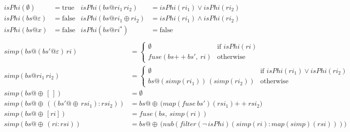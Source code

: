 \begin{equation}
\begin{gathered}
\begin{aligned}
\mathit{isPhi}(\emptyset) &= \mathrm{true} &
\mathit{isPhi}(bs@\mathit{ri}_1\,\mathit{ri}_2)
  &= \mathit{isPhi}(\mathit{ri}_1) \lor \mathit{isPhi}(\mathit{ri}_2) \\
\mathit{isPhi}(bs@\varepsilon) &= \mathrm{false} &
\mathit{isPhi}(bs@\mathit{ri}_1 \oplus \mathit{ri}_2)
  &= \mathit{isPhi}(\mathit{ri}_1) \land \mathit{isPhi}(\mathit{ri}_2) \\
\mathit{isPhi}(bs@x) &= \mathrm{false} &
\mathit{isPhi}(bs@\mathit{ri}^{*}) &= \mathrm{false}
\end{aligned}
\\[4pt]
\begin{aligned}
\mathit{simp}(bs@(bs'@\varepsilon)\,\mathit{ri}) &=
  \begin{cases}
    \emptyset & \text{if } \mathit{isPhi}(\mathit{ri}) \\
    \mathit{fuse}(bs \mathbin{+\!\!+} bs',\ \mathit{ri}) & \text{otherwise}
  \end{cases} \\[6pt]
\mathit{simp}(bs@\mathit{ri}_1\,\mathit{ri}_2) &=
  \begin{cases}
    \emptyset & \text{if } \mathit{isPhi}(\mathit{ri}_1) \lor \mathit{isPhi}(\mathit{ri}_2) \\
    bs@(\mathit{simp}(\mathit{ri}_1))\,(\mathit{simp}(\mathit{ri}_2)) & \text{otherwise}
  \end{cases} \\[6pt]
\mathit{simp}(bs@\oplus\,[\,]) &= \emptyset \\
\mathit{simp}(bs@\oplus\,((bs'@\oplus\,\mathit{rsi}_1) : \mathit{rsi}_2)) &=
  bs@\oplus\,\bigl(\mathit{map}(\mathit{fuse}\ bs')(\mathit{rsi}_1) \mathbin{+\!\!+} \mathit{rsi}_2\bigr) \\
\mathit{simp}(bs@\oplus\,[\mathit{ri}]) &= \mathit{fuse}(bs,\ \mathit{simp}(\mathit{ri})) \\
\mathit{simp}(bs@\oplus\,(\mathit{ri} : \mathit{rsi})) &=
  bs@\oplus\,\bigl(\mathit{nub}(\mathit{filter}(\lnot\,\mathit{isPhi})
  (\mathit{simp}(\mathit{ri}) : \mathit{map}(\mathit{simp})(\mathit{rsi})))\bigr)
\end{aligned}
\end{gathered}
\label{eq:simp-theory}
\end{equation}

%

